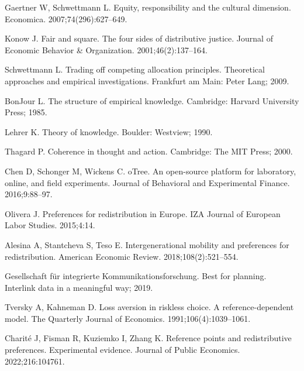 \documentclass[10pt,letterpaper]{article}
\begin{document}
\begin{thebibliography}{100}
Gaertner W, Schwettmann L.
\newblock Equity, responsibility and the cultural dimension.
\newblock Economica. 2007;74(296):627--649.

Konow J.
\newblock Fair and square. {The} four sides of distributive justice.
\newblock Journal of Economic Behavior \& Organization. 2001;46(2):137--164.

Schwettmann L.
\newblock Trading off competing allocation principles. {Theoretical} approaches
  and empirical investigations.
\newblock Frankfurt am Main: Peter Lang; 2009.

BonJour L.
\newblock The structure of empirical knowledge.
\newblock Cambridge: Harvard University Press; 1985.

Lehrer K.
\newblock Theory of knowledge.
\newblock Boulder: Westview; 1990.

Thagard P.
\newblock Coherence in thought and action.
\newblock Cambridge: The MIT Press; 2000.

Chen D, Schonger M, Wickens C.
\newblock oTree. {A}n open-source platform for laboratory, online, and field
  experiments.
\newblock Journal of Behavioral and Experimental Finance. 2016;9:88--97.

Olivera J.
\newblock Preferences for redistribution in {Europe}.
\newblock IZA Journal of European Labor Studies. 2015;4:14.

Alesina A, Stantcheva S, Teso E.
\newblock Intergenerational mobility and preferences for redistribution.
\newblock American Economic Review. 2018;108(2):521--554.

{Gesellschaft für integrierte Kommunikationsforschung}. Best for planning.
  {Interlink} data in a meaningful way; 2019.

Tversky A, Kahneman D.
\newblock Loss aversion in riskless choice. {A} reference-dependent model.
\newblock The Quarterly Journal of Economics. 1991;106(4):1039--1061.

Charit{\'e} J, Fisman R, Kuziemko I, Zhang K.
\newblock Reference points and redistributive preferences. {Experimental}
  evidence.
\newblock Journal of Public Economics. 2022;216:104761.


\end{thebibliography}
\end{document}
